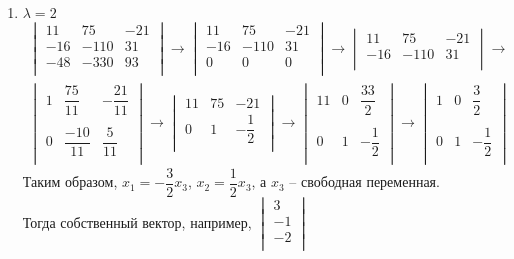 \begin{enumerate}
\begin{enumerate}
			\item $\lambda = 2$\\
				\begin{gather*}
					\begin{vmatrix}
						11 & 75 & -21\\
						-16 & -110 & 31\\
						-48 & -330 & 93\\
					\end{vmatrix}
					\to
					\begin{vmatrix}
						11 & 75 & -21\\
						-16 & -110 & 31\\ 
						0 & 0 & 0\\
					\end{vmatrix}
					\to
					\begin{vmatrix}
						11 & 75 & -21\\
						-16 & -110 & 31\\
					\end{vmatrix}
					\to
					\\
					\begin{vmatrix}
						1 & \dfrac{75}{11} & -\dfrac{21}{11}\\
						\\ 
						0 & \dfrac{-10}{11} & \dfrac{5}{11}\\
					\end{vmatrix}
					\to
					\begin{vmatrix}
						11 & 75 & -21\\
						0 & 1 & -\dfrac{1}{2}\\
					\end{vmatrix}
					\to
					\begin{vmatrix}
						11 & 0 & \dfrac{33}{2}\\
						\\
						0 & 1 & -\dfrac{1}{2}\\
					\end{vmatrix}
					\to
					\begin{vmatrix}
						1 & 0 & \dfrac{3}{2}\\
						\\
						0 & 1 & -\dfrac{1}{2}\\
					\end{vmatrix}
				\end{gather*}
				Таким образом, $x_{1} = -\dfrac{3}{2}x_{3}$, $x_{2} = \dfrac{1}{2}x_{3}$, а $x_{3}$ -- свободная переменная.\\
				Тогда собственный вектор, например, $\begin{vmatrix}
				3\\ -1\\ -2\\
				\end{vmatrix}$ 
			\end{enumerate}
		\end{enumerate}
		

